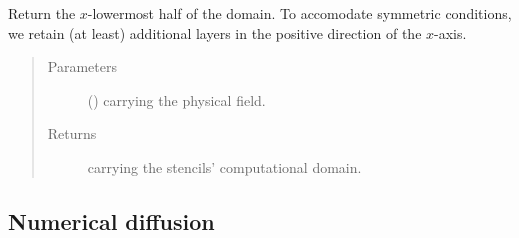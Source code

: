\documentclass[letterpaper,10pt,english]{sphinxmanual}
\begin{document}
\begin{fulllineitems}

\begin{fulllineitems}
\label{\detokenize{api:dycore.horizontal_boundary.RelaxedSymmetricYZ.from_physical_to_computational_domain}}
Return the \(x\)-lowermost half of the domain. To accomodate symmetric conditions,
we retain (at least)  additional layers in the positive direction of the \(x\)-axis.
\begin{quote}\begin{description}
\item[{Parameters}] \leavevmode
{} () \textendash{}  carrying the physical field.

\item[{Returns}] \leavevmode
{} carrying the stencils’ computational domain.

\end{description}\end{quote}

\end{fulllineitems}


\end{fulllineitems}



\subsection{Numerical diffusion}
\label{\detokenize{api:numerical-diffusion}}
\end{document}
